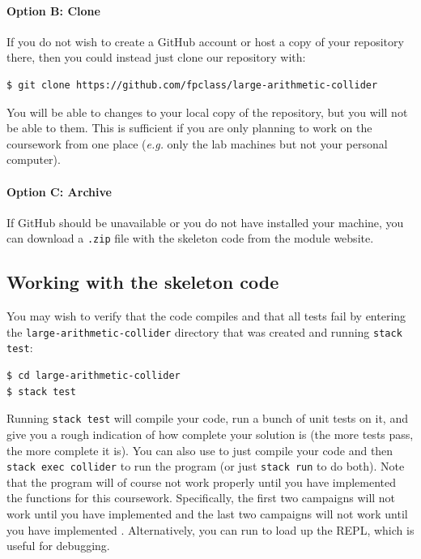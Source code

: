 \paragraph{Option B: Clone} If you do not wish to create a GitHub account or host a copy of your repository there, then you could instead just clone our repository with:
\begin{verbatim}
$ git clone https://github.com/fpclass/large-arithmetic-collider
\end{verbatim}
You will be able to  changes to your local copy of the repository, but you will not be able to  them. This is sufficient if you are only planning to work on the coursework from one place (\emph{e.g.} only the lab machines but not your personal computer).

\paragraph{Option C: Archive} If GitHub should be unavailable or you do not have  installed your machine, you can download a \texttt{\small .zip} file with the skeleton code from the module website.

\subsection{Working with the skeleton code}

You may wish to verify that the code compiles and that all tests fail by entering the \texttt{\small large-arithmetic-collider} directory that was created and running \texttt{\small stack test}:
\begin{verbatim}
$ cd large-arithmetic-collider
$ stack test
\end{verbatim}
Running \texttt{\small stack test} will compile your code, run a bunch of unit tests on it, and give you a rough indication of how complete your solution is (the more tests pass, the more complete it is). %
You can also use  to just compile your code and then \texttt{\small stack exec collider} to run the program (or just \texttt{\small stack run} to do both). Note that the program will of course not work properly until you have implemented the functions for this coursework. Specifically, the first two campaigns will not work until you have implemented  and the last two campaigns will not work until you have implemented . Alternatively, you can run  to load up the REPL, which is useful for debugging.

